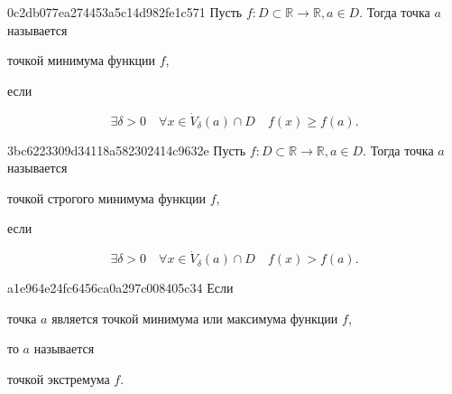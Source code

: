 \begin{note}{0c2db077ea274453a5c14d982fe1c571}
    Пусть \( f : D \subset \mathbb R \to \mathbb R, a \in D \). Тогда точка \( a \) называется \begin{icloze}{2}точкой минимума функции \( f \),\end{icloze} если
    \begin{icloze}{1}\[
        \exists \delta > 0 \quad \forall x \in \dot V_{\delta} (a) \cap D \quad f(x) \geqslant f(a).
    \]\end{icloze}
\end{note}

\begin{note}{3bc6223309d34118a582302414c9632e}
    Пусть \( f : D \subset \mathbb R \to \mathbb R, a \in D \). Тогда точка \( a \) называется \begin{icloze}{2}точкой строгого минимума функции \( f \),\end{icloze} если
    \begin{icloze}{1}\[
        \exists \delta > 0 \quad \forall x \in \dot V_{\delta} (a) \cap D \quad f(x) > f(a).
    \]\end{icloze}
\end{note}

\begin{note}{a1e964e24fc6456ca0a297c008405c34}
    Если \begin{icloze}{2}точка \( a \) является точкой минимума или максимума функции \( f \),\end{icloze} то \( a \) называется \begin{icloze}{1}точкой экстремума \( f \).\end{icloze}
\end{note}


